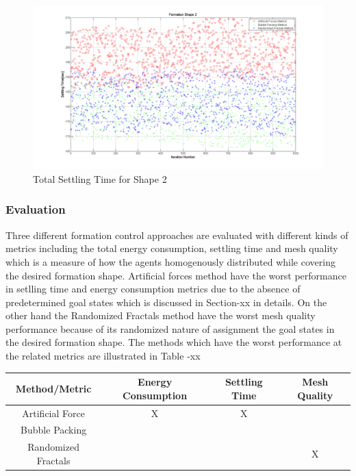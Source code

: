 		 \begin{figure}[H]
		 	\caption{Total Settling Time for Shape 2}
		 	\centerline{\includegraphics[scale = 0.35]{Total_Time_Shape_2}}
		 \end{figure} 
		 
		 
		
			 \subsubsection{Evaluation} 
		Three different formation control approaches are evaluated with different kinds of metrics including the total energy consumption, settling time and mesh quality which is a measure of how the agents homogenously distributed while covering the desired formation shape. Artificial forces method have the worst performance in setlling time and energy consumption metrics due to the absence of predetermined goal states which is discussed in Section-xx in details. On the other hand the Randomized Fractals method have the worst mesh quality performance because of its randomized nature of assignment the goal states in the desired formation shape. The methods which have the worst performance at the related metrics are illustrated in Table -xx
		
		
		\begin{center}
			 \label{tab:title} 
			\begin{tabular}{||c| c| c |c ||}
				
				\hline
				\textbf{Method/Metric} & \textbf{Energy Consumption}  & \textbf{Settling Time} & \textbf{Mesh Quality}\\ 
				\hline
				Artificial Force & X & X &  \\
				Bubble Packing & &  &  \\	
				Randomized Fractals & &  & X \\	
				\hline
			\end{tabular}
		\end{center}
		
